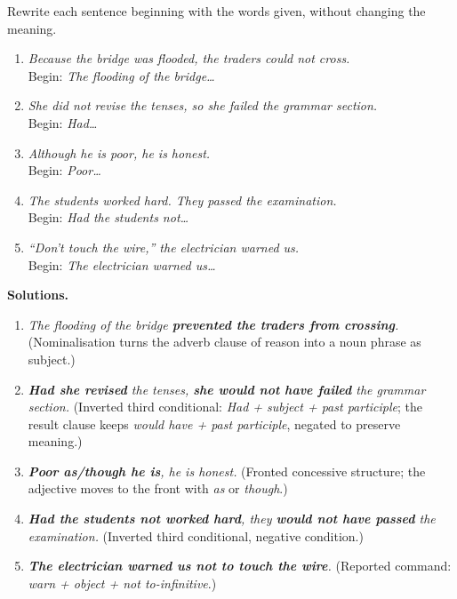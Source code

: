 \documentclass[11pt]{article}
\begin{document}
\begin{exoresolu}
Rewrite each sentence beginning with the words given, without changing the meaning.
\begin{enumerate}
\item \emph{Because the bridge was flooded, the traders could not cross.} \\ Begin: \emph{The flooding of the bridge\ldots}
\item \emph{She did not revise the tenses, so she failed the grammar section.} \\ Begin: \emph{Had\ldots}
\item \emph{Although he is poor, he is honest.} \\ Begin: \emph{Poor\ldots}
\item \emph{The students worked hard. They passed the examination.} \\ Begin: \emph{Had the students not\ldots}
\item \emph{``Don't touch the wire,'' the electrician warned us.} \\ Begin: \emph{The electrician warned us\ldots}
\end{enumerate}
\tcblower
\textbf{Solutions.}
\begin{enumerate}
\item \emph{The flooding of the bridge \textbf{prevented the traders from crossing}.} (Nominalisation turns the adverb clause of reason into a noun phrase as subject.)
\item \emph{\textbf{Had she revised} the tenses, \textbf{she would not have failed} the grammar section.} (Inverted third conditional: \emph{Had + subject + past participle}; the result clause keeps \emph{would have + past participle}, negated to preserve meaning.)
\item \emph{\textbf{Poor as/though he is}, he is honest.} (Fronted concessive structure; the adjective moves to the front with \emph{as} or \emph{though}.)
\item \emph{\textbf{Had the students not worked hard}, they \textbf{would not have passed} the examination.} (Inverted third conditional, negative condition.)
\item \emph{\textbf{The electrician warned us not to touch the wire}.} (Reported command: \emph{warn + object + not to-infinitive}.)
\end{enumerate}
\end{exoresolu}
\end{document}
